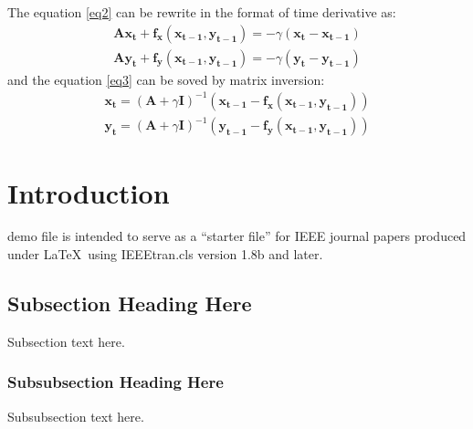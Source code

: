 \documentclass[journal]{IEEEtran}
\begin{document}
The equation \ref{eq2} can be rewrite in the format of time derivative as:
\begin{equation}\begin{aligned}
  \mathbf{Ax_t+f_x(x_{t-1},y_{t-1})}=-\gamma(\mathbf{x_t-x_{t-1}})\\
  \mathbf{Ay_t+f_y(x_{t-1},y_{t-1})}=-\gamma(\mathbf{y_t-y_{t-1}}) \label{eq3}
\end{aligned}\end{equation}
and the equation \ref{eq3} can be soved by matrix inversion:
\begin{equation}\begin{aligned}
\mathbf{x_t}=(\mathbf{A}+\gamma\mathbf{I})^{-1}(\mathbf{x_{t-1}-f_x(x_{t-1},y_{t-1})})\\
\mathbf{y_t}=(\mathbf{A}+\gamma\mathbf{I})^{-1}(\mathbf{y_{t-1}-f_y(x_{t-1},y_{t-1})})\label{eq5}
\end{aligned}\end{equation}

\section{Introduction}

 demo file is intended to serve as a ``starter file''
for IEEE journal papers produced under \LaTeX\ using
IEEEtran.cls version 1.8b and later.

\subsection{Subsection Heading Here}
Subsection text here.

\subsubsection{Subsubsection Heading Here}
Subsubsection text here.



%
\end{document}
